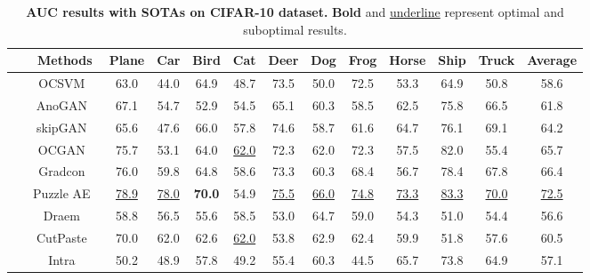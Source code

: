 \documentclass[lettersize,journal]{IEEEtran}
\begin{document}
\begin{table*}\normalsize
	\centering
	\small
	\renewcommand{\arraystretch}{1.1}
	\setlength\tabcolsep{8pt}
	\caption{\textbf{AUC results with SOTAs on CIFAR-10 dataset.} \textbf{Bold} and \underline{underline} represent optimal and suboptimal results.}
	\begin{tabular}{c|c| c c c c c c c c c c |c}\hline
		\specialrule{0em}{1pt}{0pt}
		~&Methods & Plane & Car & Bird & Cat & Deer & Dog & Frog & Horse & Ship & Truck & Average\\
		\hline
		\multirow{10}{*}{\rotatebox{90}{S1}}&OCSVM~\cite{chen2001one} & 63.0& 44.0 & 64.9 & 48.7 & 73.5 & 50.0 & 72.5 &53.3 & 64.9 & 50.8 & 58.6\\
		~&AnoGAN~\cite{schlegl2017unsupervised} & 67.1 & 54.7 & 52.9 & 54.5 & 65.1 & 60.3 & 58.5 & 62.5 & 75.8 & 66.5 & 61.8\\
        ~&skipGAN~\cite{akccay2019skip} & 65.6 & 47.6 & 66.0 & 57.8 & 74.6 & 58.7 & 61.6 & 64.7 & 76.1 & 69.1 & 64.2\\
		~&OCGAN~\cite{perera2019ocgan}  & 75.7 & 53.1 & 64.0 & \underline{62.0} & 72.3 & 62.0 & 72.3 & 57.5 & 82.0 & 55.4 & 65.7\\
		~&Gradcon~\cite{kwon2020backpropagated} & 76.0 & 59.8 & 64.8 & 58.6 & 73.3 & 60.3 & 68.4 & 56.7 & 78.4 & 67.8 & 66.4\\
		~&Puzzle AE~\cite{salehi2020puzzle} & \underline{78.9} & \underline{78.0} & \textbf{70.0} & 54.9 & \underline{75.5} & \underline{66.0} & \underline{74.8} & \underline{73.3} & \underline{83.3} & \underline{70.0} & \underline{72.5}\\
		~&Draem~\cite{zavrtanik2021draem} & 58.8 & 56.5 & 55.6 & 58.5 & 53.0 & 64.7 & 59.0 & 54.3 & 51.0 & 54.4 & 56.6\\
		~&CutPaste~\cite{li2021cutpaste} & 70.0 & 62.0 & 62.6 & \underline{62.0} & 53.8 & 62.9 & 62.4 & 59.9 & 51.8 & 57.6 & 60.5\\
		~&Intra~\cite{pirnay2022inpainting} & 50.2 & 48.9 & 57.8 & 49.2 & 55.4 & 60.3 & 44.5 & 65.7 & 73.8 & 64.9 & 57.1\\

\end{tabular}
\end{table*}
\end{document}
